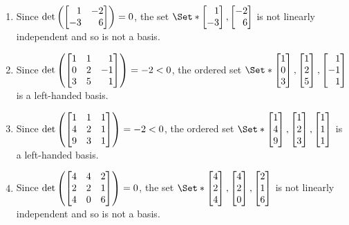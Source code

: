 \begin{exercises}
\begin{problist}
\begin{solution}
\begin{enumerate}
				\item Since $\det\left(\mat{1 & -2 \\ -3 & 6}\right)=0$, the set
					$\Set*{\mat{1 \\ -3},\mat{-2 \\ 6}}$ is not linearly
					independent and so is not a basis.

				\item Since $\det\left(\mat{1 & 1 & 1 \\ 0 & 2 & -1 \\ 3 & 5 & 1}\right)=-2<
					0$, the ordered set
					$\Set*{\mat{1 \\ 0 \\ 3},\mat{1 \\ 2 \\ 5},\mat{1 \\ -1 \\ 1}}$
					is a left-handed basis.

				\item Since $\det\left(\mat{1 & 1 & 1 \\ 4 & 2 & 1 \\ 9 & 3 & 1}\right)=-2<0$,
					the ordered set
					$\Set*{\mat{1 \\ 4 \\ 9},\mat{1 \\ 2 \\ 3},\mat{1 \\ 1 \\ 1}}$
					is a left-handed basis.

				\item Since $\det\left(\mat{4 & 4 & 2 \\ 2 & 2 & 1 \\ 4 & 0 & 6}\right)=0$,
					the set
					$\Set*{\mat{4 \\ 2 \\ 4},\mat{4 \\ 2 \\ 0},\mat{2 \\ 1 \\ 6}}$
					is not linearly independent and so is not a basis.
			\end{enumerate}
		\end{solution}


\end{problist}
\end{exercises}
